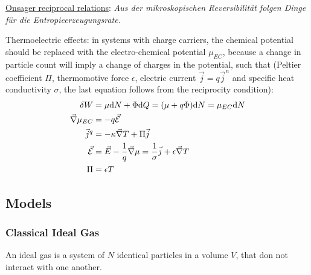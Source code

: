 			\noindent
			\href{https://en.wikipedia.org/wiki/Onsager_reciprocal_relations}{Onsager reciprocal relations}:
			\newline\indent\emph{Aus der mikroskopischen Reversibilität folgen Dinge für die Entropieerzeugungsrate.}\vsp %

			\noindent
			Thermoelectric effects: in systems with charge carriers, the chemical potential should be replaced with the electro-chemical potential $\mu_{EC}$, because a change in particle count will imply a change of charges in the potential, such that (Peltier coefficient $\Pi$, thermomotive force $\epsilon$, electric current $\vec{j} = q\vec{j}^n$ and specific heat conductivity $\sigma$, the last equation follows from the reciprocity condition):
			\begin{equation}
				\begin{aligned}
					\delta W &= \mu \dd N + \Phi \dd Q = (\mu+q\Phi)\dd N = \mu_{EC} \dd N \\
					\vec{\nabla} \mu_{EC} &= -q\vec{\mathcal{E}} \\
					\vec{j}^q &= - \kappa \vec{\nabla} T + \Pi \vec{j} \\
					\vec{\mathcal{E}} &= \vec{E} - \frac{1}{q} \vec{\nabla} \mu = \frac{1}{\sigma} \vec{j} + \epsilon \vec{\nabla} T \\
					\Pi &= \epsilon T \\
				\end{aligned}
			\end{equation}


	\subsection{Models}
		\subsubsection{Classical Ideal Gas}
			\noindent
			An ideal gas is a system of $N$ identical particles in a volume $V$, that don not interact with one another.\vsp

